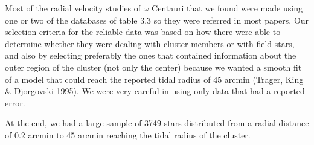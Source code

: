 Most of the radial velocity studies of $\omega$ Centauri that we found were made using one or two of the databases of table 3.3 so they were referred in most papers. Our selection criteria for the reliable data was based on how there were able to determine whether they were dealing with cluster members or with field stars, and also by selecting preferably the ones that contained information about the outer region of the cluster (not only the center) because we wanted a smooth fit of a model that could reach the reported tidal radius of 45 arcmin (Trager, King \& Djorgovski 1995). We were very careful in using only data that had a reported error.

At the end, we had a large sample of 3749 stars distributed from a radial distance of 0.2 arcmin to 45 arcmin reaching the tidal radius of the cluster.  